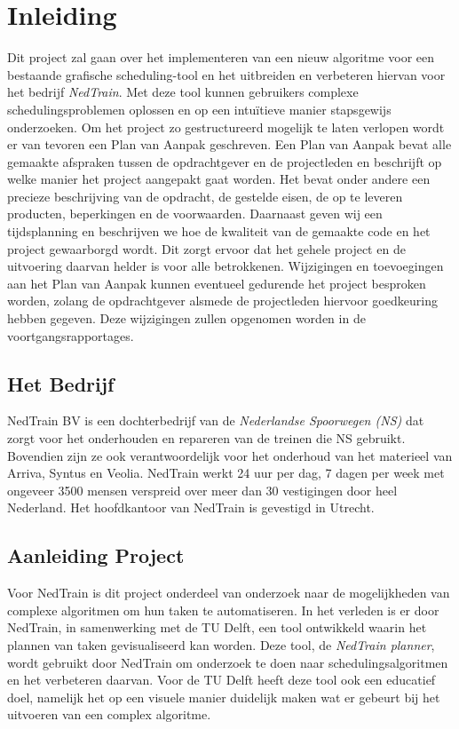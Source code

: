 \section{Inleiding}
Dit project zal gaan over het implementeren van een nieuw algoritme voor een bestaande grafische scheduling-tool en het uitbreiden en verbeteren hiervan voor het bedrijf \emph{NedTrain}. Met deze tool kunnen gebruikers complexe schedulingsproblemen oplossen en op een intu\"itieve manier stapsgewijs onderzoeken. Om het project zo gestructureerd mogelijk te laten verlopen wordt er van tevoren een Plan van Aanpak geschreven. Een Plan van Aanpak bevat alle gemaakte afspraken tussen de opdrachtgever en de projectleden en beschrijft op welke manier het project aangepakt gaat worden. Het bevat onder andere een precieze beschrijving van de opdracht, de gestelde eisen, de op te leveren producten, beperkingen en de voorwaarden. Daarnaast geven wij een tijdsplanning en beschrijven we hoe de kwaliteit van de gemaakte code en het project gewaarborgd wordt. Dit zorgt ervoor dat het gehele project en de uitvoering daarvan helder is voor alle betrokkenen. Wijzigingen en toevoegingen aan het Plan van Aanpak kunnen eventueel gedurende het project besproken worden, zolang de opdrachtgever alsmede de projectleden hiervoor goedkeuring hebben gegeven. Deze wijzigingen zullen opgenomen worden in de voortgangsrapportages.

\subsection{Het Bedrijf}
NedTrain BV is een dochterbedrijf van de \emph{Nederlandse Spoorwegen (NS)} dat zorgt voor het onderhouden en repareren van de treinen die NS gebruikt. \cite{NedTrainSite} Bovendien zijn ze ook verantwoordelijk voor het onderhoud van het materieel van Arriva, Syntus en Veolia. NedTrain werkt 24 uur per dag, 7 dagen per week met ongeveer 3500 mensen verspreid over meer dan 30 vestigingen door heel Nederland. Het hoofdkantoor van NedTrain is gevestigd in Utrecht.

\subsection{Aanleiding Project}
Voor NedTrain is dit project onderdeel van onderzoek naar de mogelijkheden van complexe algoritmen om hun taken te automatiseren. In het verleden is er door NedTrain, in samenwerking met de TU Delft, een tool ontwikkeld waarin het plannen van taken gevisualiseerd kan worden. Deze tool, de \emph{NedTrain planner}, wordt gebruikt door NedTrain om onderzoek te doen naar schedulingsalgoritmen en het verbeteren daarvan. Voor de TU Delft heeft deze tool ook een educatief doel, namelijk het op een visuele manier duidelijk maken wat er gebeurt bij het uitvoeren van een complex algoritme.

